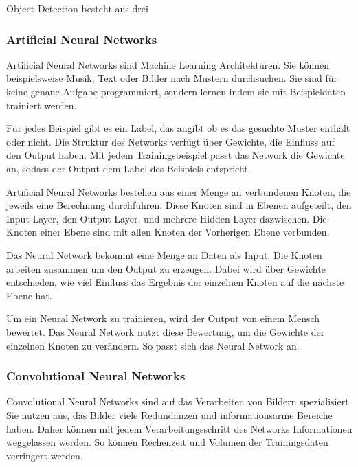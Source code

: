 Object Detection besteht aus drei 




\subsubsection{Artificial Neural Networks}
Artificial Neural Networks sind Machine Learning Architekturen. Sie können beispielsweise Musik, Text oder Bilder nach Mustern durchsuchen. Sie sind für keine genaue Aufgabe programmiert, sondern lernen indem sie mit Beispieldaten trainiert werden. 

Für jedes Beispiel gibt es ein Label, das angibt ob es das gesuchte Muster enthält oder nicht. Die Struktur des Networks verfügt über Gewichte, die Einfluss auf den Output haben. Mit jedem Trainingsbeispiel passt das Network die Gewichte an, sodass der Output dem Label des Beispiels entspricht.\citep{introToCNN,surveyOfDeepLearing}

Artificial Neural Networks bestehen aus einer Menge an verbundenen Knoten, die jeweils eine Berechnung durchführen. Diese Knoten sind in Ebenen aufgeteilt, den Input Layer, den Output Layer, und mehrere Hidden Layer dazwischen. Die Knoten einer Ebene sind mit allen Knoten der Vorherigen Ebene verbunden.\citep{introToCNN,surveyOfDeepLearing}

Das Neural Network bekommt eine Menge an Daten als Input. Die Knoten arbeiten zusammen um den Output zu erzeugen. Dabei wird über Gewichte entschieden, wie viel Einfluss das Ergebnis der einzelnen Knoten auf die nächste Ebene hat.\citep{introToCNN,surveyOfDeepLearing}

Um ein Neural Network zu trainieren, wird der Output von einem Mensch bewertet. Das Neural Network nutzt diese Bewertung, um die Gewichte der einzelnen Knoten zu verändern. So passt sich das Neural Network an. \citep{introToCNN,surveyOfDeepLearing}

\subsubsection{Convolutional Neural Networks}
Convolutional Neural Networks sind auf das Verarbeiten von Bildern spezialisiert. Sie nutzen aus, das Bilder viele Redundanzen und informationsarme Bereiche haben. Daher können mit jedem Verarbeitungsschritt des Networks Informationen weggelassen werden. So können Rechenzeit und Volumen der Trainingsdaten verringert werden.\citep{introToCNN,surveyOfDeepLearing,cNNforClass}

